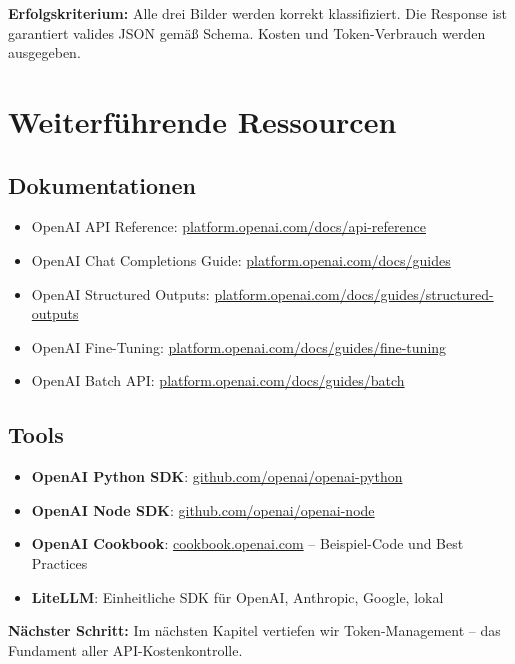 \textbf{Erfolgskriterium:} Alle drei Bilder werden korrekt klassifiziert. Die Response ist garantiert valides JSON gemäß Schema. Kosten und Token-Verbrauch werden ausgegeben.

\section{Weiterführende Ressourcen}

\subsection{Dokumentationen}

\begin{itemize}[leftmargin=*]
    \item OpenAI API Reference: \href{https://platform.openai.com/docs/api-reference}{platform.openai.com/docs/api-reference}
    \item OpenAI Chat Completions Guide: \href{https://platform.openai.com/docs/guides/chat-completions}{platform.openai.com/docs/guides}
    \item OpenAI Structured Outputs: \href{https://platform.openai.com/docs/guides/structured-outputs}{platform.openai.com/docs/guides/structured-outputs}
    \item OpenAI Fine-Tuning: \href{https://platform.openai.com/docs/guides/fine-tuning}{platform.openai.com/docs/guides/fine-tuning}
    \item OpenAI Batch API: \href{https://platform.openai.com/docs/guides/batch}{platform.openai.com/docs/guides/batch}
\end{itemize}

\subsection{Tools}

\begin{itemize}[leftmargin=*]
    \item \textbf{OpenAI Python SDK}: \href{https://github.com/openai/openai-python}{github.com/openai/openai-python}
    \item \textbf{OpenAI Node SDK}: \href{https://github.com/openai/openai-node}{github.com/openai/openai-node}
    \item \textbf{OpenAI Cookbook}: \href{https://cookbook.openai.com}{cookbook.openai.com} -- Beispiel-Code und Best Practices
    \item \textbf{LiteLLM}: Einheitliche SDK für OpenAI, Anthropic, Google, lokal
\end{itemize}

\textbf{Nächster Schritt:} Im nächsten Kapitel vertiefen wir Token-Management -- das Fundament aller API-Kostenkontrolle.
